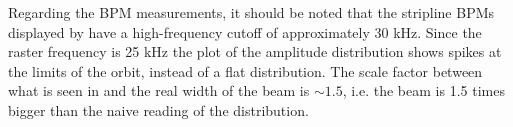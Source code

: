 Regarding the BPM measurements, it should be noted that 
the stripline BPMs displayed by  have a high-frequency 
cutoff of approximately 30 kHz.  Since the raster frequency is 25 kHz
the plot of the amplitude distribution shows spikes at the 
limits of the orbit, instead of a flat distribution.  The scale
factor between what is seen in  and the real width of the beam
is $\sim 1.5$, i.e. the beam is 1.5 times bigger than the naive
reading of the  distribution.


%
%
%
%
%
%
%
%
